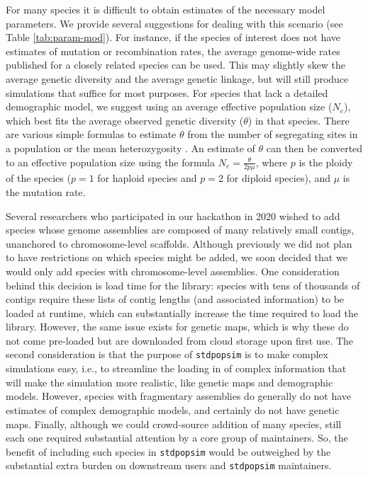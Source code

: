 \documentclass[hidelinks]{article}
\newcommand{\stdpopsim}{\texttt{stdpopsim}\xspace}
\begin{document}
For many species it is difficult to obtain estimates of the necessary model parameters.
We provide several suggestions for dealing with this scenario (see Table \ref{tab:param-mod}).
For instance, if the species of interest does not have estimates of mutation or recombination rates,
the average genome-wide rates published for a closely related species can be used.
This may slightly skew the average genetic diversity and the average genetic linkage,
but will still produce simulations that suffice for most purposes.
For species that lack a detailed demographic model,
we suggest using an average effective population size ($N_e$),
which best fits the average observed genetic diversity ($\theta$) in that species.
There are various simple formulas to estimate $\theta$ from the number of segregating sites in a population \citep{Watterson1975}
or the mean heterozygosity \citep{nei1979mathematical, tajima1983evolutionary}.
An estimate of $\theta$ can then be converted to an effective population size using the formula $N_e=\frac {\theta} {2p\mu}$,
where $p$ is the ploidy of the species ($p=1$ for haploid species and $p=2$ for diploid species), and $\mu$ is the mutation rate.

Several researchers who participated in our hackathon in 2020 wished to add species whose
genome assemblies are composed of many relatively small contigs, unanchored to chromosome-level scaffolds.
Although previously we did not plan to have restrictions on which species might be added,
we soon decided that we would only add species with chromosome-level assemblies.
One consideration behind this decision is load time for the library: species with tens of thousands of contigs
require these lists of contig lengths (and associated information) to be loaded at runtime,
which can substantially increase the time required to load the library.
However, the same issue exists for genetic maps,
which is why these do not come pre-loaded but are downloaded from cloud storage upon first use.
The second consideration is that the purpose of \stdpopsim is to make complex simulations easy,
i.e., to streamline the loading in of complex information that will make the simulation more realistic,
like genetic maps and demographic models.
However, species with fragmentary assemblies do generally do not have estimates of complex demographic models,
and certainly do not have genetic maps.
Finally, although we could crowd-source addition of many species,
still each one required substantial attention by a core group of maintainers.
So, the benefit of including such species in \stdpopsim would be outweighed
by the substantial extra burden on downstream users and \stdpopsim maintainers.
\end{document}
